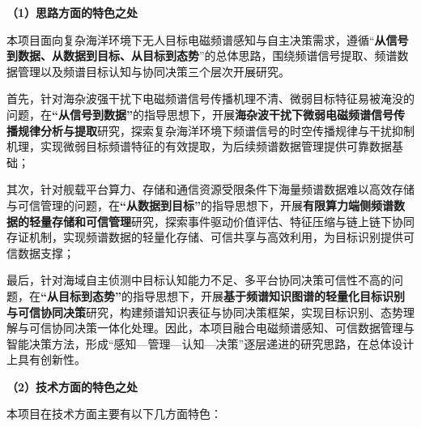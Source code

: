 \textbf{（1）思路方面的特色之处}


本项目面向复杂海洋环境下无人目标电磁频谱感知与自主决策需求，遵循“\textbf{从信号到数据、从数据到目标、从目标到态势}”的总体思路，围绕频谱信号提取、频谱数据管理以及频谱目标认知与协同决策三个层次开展研究。

首先，针对海杂波强干扰下电磁频谱信号传播机理不清、微弱目标特征易被淹没的问题，在\textbf{“从信号到数据”}的指导思想下，开展\textbf{海杂波干扰下微弱电磁频谱信号传播规律分析与提取}研究，探索复杂海洋环境下频谱信号的时空传播规律与干扰抑制机理，实现微弱目标频谱特征的有效提取，为后续频谱数据管理提供可靠数据基础；

其次，针对舰载平台算力、存储和通信资源受限条件下海量频谱数据难以高效存储与可信管理的问题，在\textbf{“从数据到目标”}的指导思想下，开展\textbf{有限算力端侧频谱数据的轻量存储和可信管理}研究，探索事件驱动价值评估、特征压缩与链上链下协同存证机制，实现频谱数据的轻量化存储、可信共享与高效利用，为目标识别提供可信数据支撑；

最后，针对海域自主侦测中目标认知能力不足、多平台协同决策可信性不高的问题，在\textbf{“从目标到态势”}的指导思想下，开展\textbf{基于频谱知识图谱的轻量化目标识别与可信协同决策}研究，构建频谱知识表征与协同决策框架，实现目标识别、态势理解与可信协同决策一体化处理。因此，本项目融合电磁频谱感知、可信数据管理与智能决策方法，形成“感知—管理—认知—决策”逐层递进的研究思路，在总体设计上具有创新性。




\textbf{（2）技术方面的特色之处}

%
%
%
本项目在技术方面主要有以下几方面特色：

